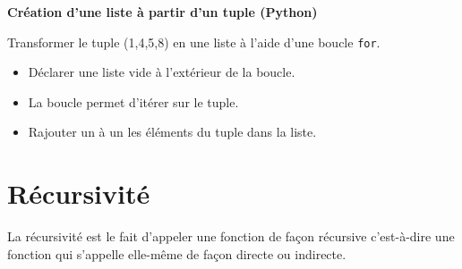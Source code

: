    \begin{Exercice}[10 minutes] \textbf{Création d'une liste à partir d'un tuple (Python)}
      	
      	Transformer le tuple (1,4,5,8) en une liste à l'aide d'une boucle \lstinline{for}.
    
        \begin{conseil}
           \begin{itemize}
           	\item Déclarer une liste vide à l'extérieur de la boucle.
           	\item La boucle permet d'itérer sur le tuple.
           	\item Rajouter un à un les éléments du tuple dans la liste.
           \end{itemize}
		     
        \end{conseil}
        
        \begin{solution}
            
        \end{solution}
    \end{Exercice}

     \section{Récursivité}
    
    La récursivité est le fait d'appeler une fonction de façon récursive c'est-à-dire une fonction qui s'appelle elle-même de façon directe ou indirecte. \\\\

